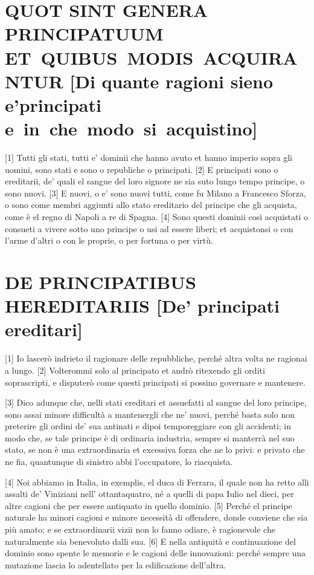 \setcounter{secnumdepth}{2}

\quebra\section{QUOT SINT GENERA PRINCIPATUUM ET~QUIBUS~MODIS~ACQUIRANTUR\break
{[}Di quante ragioni sieno e'principati e~in~che~modo~si~acquistino{]}}

{[}1{]} Tutti gli stati, tutti e' dominii che hanno avuto et hanno
imperio sopra gli uomini, sono stati e sono o republiche o principati.
{[}2{]} E principati sono o ereditarii, de' quali el sangue del loro
signore ne sia suto lungo tempo principe, o sono nuovi. {[}3{]} E nuovi,
o e' sono nuovi tutti, come fu Milano a Francesco Sforza, o sono come
membri aggiunti allo stato ereditario del principe che gli acquista,
come è el regno di Napoli a re di Spagna. {[}4{]} Sono questi dominii
così acquistati o consueti a vivere sotto uno principe o usi ad essere
liberi; et acquistonsi o con l'arme d'altri o con le proprie, o per
fortuna o per virtù.

\quebra\section{DE PRINCIPATIBUS HEREDITARIIS\break
{[}De' principati ereditari{]}}

{[}1{]} Io lascerò indrieto il ragionare delle repubbliche, perché altra
volta ne ragionai a lungo. {[}2{]} Volterommi solo al principato et
andrò ritexendo gli orditi soprascripti, e disputerò come questi
principati si possino governare e mantenere.

{[}3{]} Dico adunque che, nelli stati ereditari et assuefatti al sangue
del loro principe, sono assai minore difficultà a mantenergli che ne'
nuovi, perché basta solo non preterire gli ordini de' sua antinati e
dipoi temporeggiare con gli accidenti; in modo che, se tale principe è
di ordinaria industria, sempre si manterrà nel suo stato, se non è una
extraordinaria et excessiva forza che ne lo privi: e privato che ne fia,
quantunque di sinistro abbi l'occupatore, lo riacquista.

{[}4{]} Noi abbiamo in Italia, in exemplis, el duca di Ferrara, il quale
non ha retto alli assalti de' Viniziani nell' ottantaquatro, né a quelli
di papa Iulio nel dieci, per altre cagioni che per essere antiquato in quello dominio. {[}5{]} Perché el
principe naturale ha minori cagioni e minore necessità di offendere,
donde conviene che sia più amato; e se extraordinarii vizii non lo fanno
odiare, è ragionevole che naturalmente sia benevoluto dalli sua. {[}6{]}
E nella antiquità e continuazione del dominio sono spente le memorie e
le cagioni delle innovazioni: perché sempre una mutazione lascia lo
adentellato per la edificazione dell'altra.

